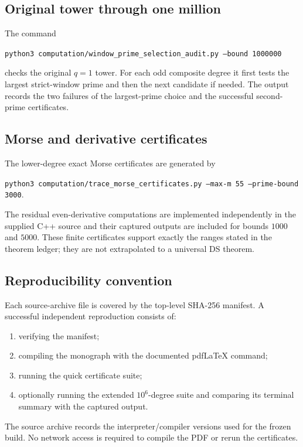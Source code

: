 \subsection{Original tower through one million}

The command
\begin{center}
\texttt{python3 computation/window\_prime\_selection\_audit.py
  --bound 1000000}
\end{center}
checks the original \(q=1\) tower.  For each odd composite degree it first
tests the largest strict-window prime and then the next candidate if needed.
The output records the two failures of the largest-prime choice and the
successful second-prime certificates.

\subsection{Morse and derivative certificates}

The lower-degree exact Morse certificates are generated by
\begin{center}
\texttt{python3 computation/trace\_morse\_certificates.py
  --max-m 55 --prime-bound 3000}.
\end{center}
The residual even-derivative computations are implemented independently in
the supplied C++ source and their captured outputs are included for bounds
\(1000\) and \(5000\).  These finite certificates support exactly the ranges
stated in the theorem ledger; they are not extrapolated to a universal DS
theorem.

\subsection{Reproducibility convention}

Each source-archive file is covered by the top-level SHA-256 manifest.  A
successful independent reproduction consists of:

\begin{enumerate}
\item verifying the manifest;
\item compiling the monograph with the documented pdfLaTeX command;
\item running the quick certificate suite;
\item optionally running the extended \(10^6\)-degree suite and comparing
its terminal summary with the captured output.
\end{enumerate}

The source archive records the interpreter/compiler versions used for the
frozen build.  No network access is required to compile the PDF or rerun the
certificates.
